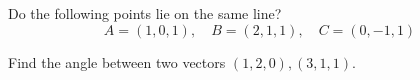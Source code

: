 \documentclass[openany]{book}
\begin{document}
\begin{prob}
    Do the following points lie on the same line?
    \begin{equation*}
        A=(1,0,1),\quad B=(2,1,1), \quad C=(0,-1,1)
    \end{equation*}
\end{prob}


\begin{prob}
    Find the angle between two vectors $(1,2,0), (3,1,1)$.
\end{prob}
\end{document}
